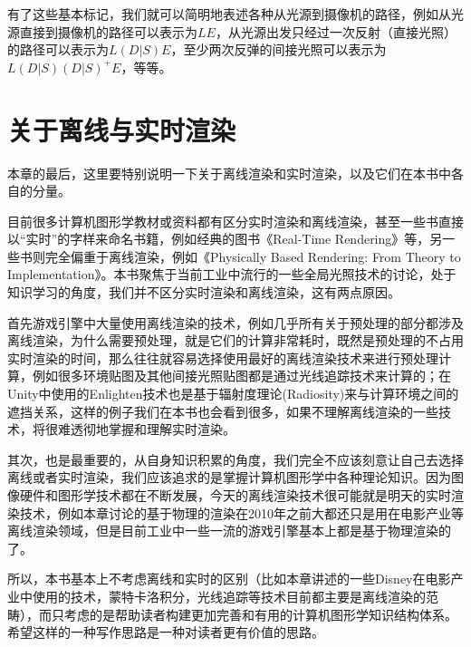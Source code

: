 有了这些基本标记，我们就可以简明地表述各种从光源到摄像机的路径，例如从光源直接到摄像机的路径可以表示为$LE$，从光源出发只经过一次反射（直接光照）的路径可以表示为$L(D|S)E$，至少两次反弹的间接光照可以表示为$L(D|S)(D|S)^{+}E$，等等。



\section{关于离线与实时渲染}
本章的最后，这里要特别说明一下关于离线渲染和实时渲染，以及它们在本书中各自的分量。

目前很多计算机图形学教材或资料都有区分实时渲染和离线渲染，甚至一些书直接以“实时”的字样来命名书籍，例如经典的图书《Real-Time Rendering》\cite{b:rtr}等，另一些书则完全偏重于离线渲染，例如《Physically Based Rendering: From Theory to Implementation》\cite{b:pbrt}。本书聚焦于当前工业中流行的一些全局光照技术的讨论，处于知识学习的角度，我们并不区分实时渲染和离线渲染，这有两点原因。

首先游戏引擎中大量使用离线渲染的技术，例如几乎所有关于预处理的部分都涉及离线渲染，为什么需要预处理，就是它们的计算非常耗时，既然是预处理的不占用实时渲染的时间，那么往往就容易选择使用最好的离线渲染技术来进行预处理计算，例如很多环境贴图及其他间接光照贴图都是通过光线追踪技术来计算的；在Unity中使用的Enlighten技术也是基于辐射度理论(Radiosity)来与计算环境之间的遮挡关系，这样的例子我们在本书也会看到很多，如果不理解离线渲染的一些技术，将很难透彻地掌握和理解实时渲染。

其次，也是最重要的，从自身知识积累的角度，我们完全不应该刻意让自己去选择离线或者实时渲染，我们应该追求的是掌握计算机图形学中各种理论知识。因为图像硬件和图形学技术都在不断发展，今天的离线渲染技术很可能就是明天的实时渲染技术，例如本章讨论的基于物理的渲染在2010年之前大都还只是用在电影产业等离线渲染领域，但是目前工业中一些一流的游戏引擎基本上都是基于物理渲染的了。

所以，本书基本上不考虑离线和实时的区别（比如本章讲述的一些Disney在电影产业中使用的技术，蒙特卡洛积分，光线追踪等技术目前都主要是离线渲染的范畴），而只考虑的是帮助读者构建更加完善和有用的计算机图形学知识结构体系。希望这样的一种写作思路是一种对读者更有价值的思路。

